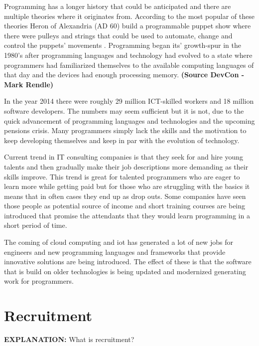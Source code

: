\documentclass[11pt,a4paper,oneside,article]{memoir}
\begin{document}
Programming has %
a longer history that could be anticipated and there are multiple theories where it originates from. According to the most popular of these theories Heron of Alexandria (AD 60) build a programmable puppet show where there were pulleys and strings that could be used to automate, change and control the puppets' movements \cite{Randell:1994}. Programming began its' growth-spur in the 1980's after programming languages and technology had evolved to a state where programmers had familiarized themselves to the available computing languages of that day and the devices had enough processing memory. \textbf{(Source DevCon - Mark Rendle)}

In the year 2014 there were roughly 29 million ICT-skilled workers and 18 million software developers. \cite{idc:numberof} The numbers may seem sufficient but it is not, due to the quick advancement of programming languages and technologies and the upcoming pensions crisis. Many programmers simply lack the skills and the motivation to keep developing themselves and keep in par with the evolution of technology.

Current trend in IT consulting companies is that they seek for and hire young talents and then gradually make their job descriptions more demanding as their skills improve. This trend is great for talented programmers who are eager to learn more while getting paid but for those who are struggling with the basics it means that in often cases they end up as drop outs. Some companies have seen those people as potential source of income and short training courses are being introduced that promise the attendants that they would learn programming in a short period of time.

The coming of cloud computing and \gls{iot} has generated a lot of new jobs for engineers and new programming languages and frameworks that provide innovative solutions are being introduced. The effect of these is that the software that is build on older technologies is being updated and modernized generating work for programmers.

\section{Recruitment}
\textbf{EXPLANATION:} What is recruitment?
\end{document}
